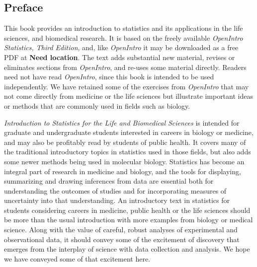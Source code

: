 \begin{doublespace}

\chapter*{Preface}



This book provides an introduction to statistics and its applications in the life sciences, and biomedical research.  It is based on the freely available \textsl{OpenIntro Statistics, Third Edition}, and, like \textsl{OpenIntro} it may be downloaded as a free PDF at \textbf{Need location}.  The text adds substantial new material, revises or eliminates sections from \textsl{OpenIntro}, and re-uses some material directly.  Readers need not have read \textsl{OpenIntro}, since this book is intended to be used independently.  We have retained some of the exercises from \textsl{OpenIntro} that may not come directly from medicine or the life sciences but illustrate important ideas or methods that are commonly used in fields such as biology.

\textsl{Introduction to Statistics for the Life and Biomedical Sciences} is intended for graduate and undergraduate students interested in careers in biology or medicine, and may also be profitably read by students of public health.  It covers many of the traditional introductory topics in statistics used in those fields, but also adds some newer methods being used in molecular biology.  Statistics has become an integral part of research in medicine and biology, and the tools for displaying, summarizing and drawing inferences from data are essential both for understanding the outcomes of studies and for incorporating measures of uncertainty into that understanding.  An introductory text in statistics for students considering careers in medicine, public health or the life sciences should be more than the usual introduction with more examples from biology or medical science. Along with the value of careful, robust analyses of experimental and observational data, it should convey some of the excitement of discovery that emerges from the interplay of science with data collection and analysis.  We hope we  have conveyed some of that excitement here. 


\end{doublespace}
